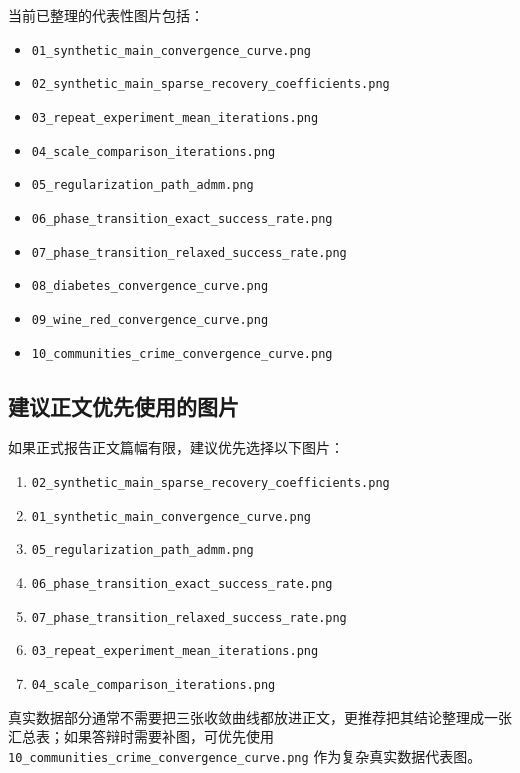 \documentclass[12pt,a4paper]{ctexart}
\begin{document}
当前已整理的代表性图片包括：
\begin{itemize}[leftmargin=2em]
    \item \texttt{01\_synthetic\_main\_convergence\_curve.png}
    \item \texttt{02\_synthetic\_main\_sparse\_recovery\_coefficients.png}
    \item \texttt{03\_repeat\_experiment\_mean\_iterations.png}
    \item \texttt{04\_scale\_comparison\_iterations.png}
    \item \texttt{05\_regularization\_path\_admm.png}
    \item \texttt{06\_phase\_transition\_exact\_success\_rate.png}
    \item \texttt{07\_phase\_transition\_relaxed\_success\_rate.png}
    \item \texttt{08\_diabetes\_convergence\_curve.png}
    \item \texttt{09\_wine\_red\_convergence\_curve.png}
    \item \texttt{10\_communities\_crime\_convergence\_curve.png}
\end{itemize}

\subsection{建议正文优先使用的图片}
如果正式报告正文篇幅有限，建议优先选择以下图片：
\begin{enumerate}[label=\arabic*.]
    \item \texttt{02\_synthetic\_main\_sparse\_recovery\_coefficients.png}
    \item \texttt{01\_synthetic\_main\_convergence\_curve.png}
    \item \texttt{05\_regularization\_path\_admm.png}
    \item \texttt{06\_phase\_transition\_exact\_success\_rate.png}
    \item \texttt{07\_phase\_transition\_relaxed\_success\_rate.png}
    \item \texttt{03\_repeat\_experiment\_mean\_iterations.png}
    \item \texttt{04\_scale\_comparison\_iterations.png}
\end{enumerate}

真实数据部分通常不需要把三张收敛曲线都放进正文，更推荐把其结论整理成一张汇总表；如果答辩时需要补图，可优先使用 \texttt{10\_communities\_crime\_convergence\_curve.png} 作为复杂真实数据代表图。
\end{document}
